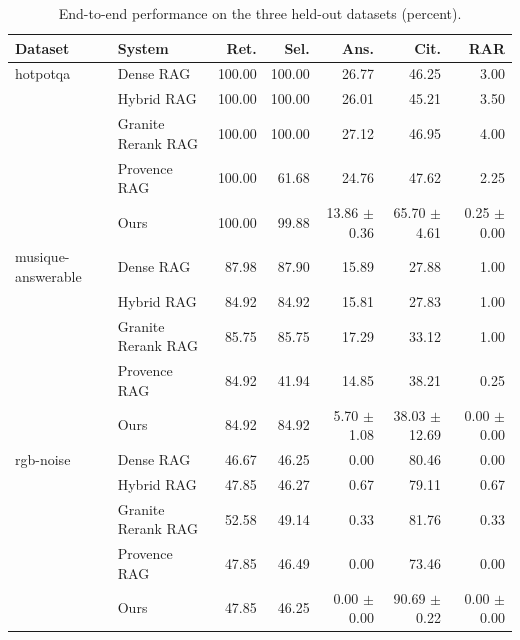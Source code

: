 \begin{table}[t]
\centering
\caption{End-to-end performance on the three held-out datasets (percent).}
\label{tab:experiment04-main}
\begin{tabular}{llrrrrr}
\toprule
Dataset & System & Ret. & Sel. & Ans. & Cit. & RAR \\
\midrule
hotpotqa & Dense RAG & 100.00 & 100.00 & 26.77 & 46.25 & 3.00 \\
 & Hybrid RAG & 100.00 & 100.00 & 26.01 & 45.21 & 3.50 \\
 & Granite Rerank RAG & 100.00 & 100.00 & 27.12 & 46.95 & 4.00 \\
 & Provence RAG & 100.00 & 61.68 & 24.76 & 47.62 & 2.25 \\
 & Ours & 100.00 & 99.88 & 13.86 $\pm$ 0.36 & 65.70 $\pm$ 4.61 & 0.25 $\pm$ 0.00 \\
\midrule
musique-answerable & Dense RAG & 87.98 & 87.90 & 15.89 & 27.88 & 1.00 \\
 & Hybrid RAG & 84.92 & 84.92 & 15.81 & 27.83 & 1.00 \\
 & Granite Rerank RAG & 85.75 & 85.75 & 17.29 & 33.12 & 1.00 \\
 & Provence RAG & 84.92 & 41.94 & 14.85 & 38.21 & 0.25 \\
 & Ours & 84.92 & 84.92 & 5.70 $\pm$ 1.08 & 38.03 $\pm$ 12.69 & 0.00 $\pm$ 0.00 \\
\midrule
rgb-noise & Dense RAG & 46.67 & 46.25 & 0.00 & 80.46 & 0.00 \\
 & Hybrid RAG & 47.85 & 46.27 & 0.67 & 79.11 & 0.67 \\
 & Granite Rerank RAG & 52.58 & 49.14 & 0.33 & 81.76 & 0.33 \\
 & Provence RAG & 47.85 & 46.49 & 0.00 & 73.46 & 0.00 \\
 & Ours & 47.85 & 46.25 & 0.00 $\pm$ 0.00 & 90.69 $\pm$ 0.22 & 0.00 $\pm$ 0.00 \\
\bottomrule
\end{tabular}
\end{table}
